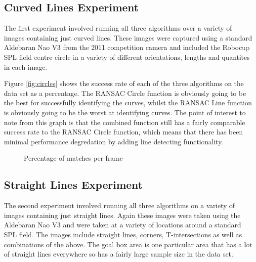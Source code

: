 \documentclass[runningheads,a4paper]{llncs}
\begin{document}
\subsection{Curved Lines Experiment}
The first experiment involved running all three algorithms over a variety of images containing just curved lines. These images were captured using a standard Aldebaran Nao V3 from the 2011 competition camera and included the Robocup SPL field centre circle in a variety of different orientations, lengths and quantites in each image.

Figure \ref{fig:circles} shows the success rate of each of the three algorithms on the data set as a percentage. The RANSAC Circle function is obviously going to be the best for successfully identifying the curves, whilst the RANSAC Line function is obviously going to be the worst at identifying curves. The point of interest to note from this graph is that the combined function still has a fairly comparable success rate to the RANSAC Circle function, which means that there has been minimal performance degredation by adding line detecting functionality.

\begin{figure}[h!]
  \centering
  \caption{Percentage of matches per frame\label{both}}
\end{figure}


\subsection{Straight Lines Experiment}
The second experiment involved running all three algorithms on a variety of images containing just straight lines. Again these images were taken using the Aldebaran Nao V3 and were taken at a variety of locations around a standard SPL field. The images include straight lines, corners, T-intersections as well as combinations of the above. The goal box area is one particular area that has a lot of straight lines everywhere so has a fairly large sample size in the data set.
\end{document}
